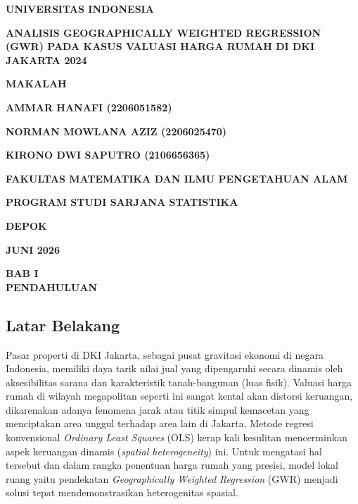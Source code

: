 \documentclass[12pt,a4paper]{article}
\begin{document}
\begin{titlepage}
    \centering
    \vspace*{1cm}
    {\normalsize \textbf{UNIVERSITAS INDONESIA}} \par\vspace{3cm}

    {\large \textbf{ANALISIS GEOGRAPHICALLY WEIGHTED REGRESSION (GWR) PADA KASUS VALUASI HARGA RUMAH DI DKI JAKARTA 2024}} \par\vspace{4cm}

    {\normalsize \textbf{MAKALAH}} \par\vspace{3cm}

    {\normalsize \textbf{AMMAR HANAFI (2206051582)}} \par
    {\normalsize \textbf{NORMAN MOWLANA AZIZ (2206025470)}} \par
    {\normalsize \textbf{KIRONO DWI SAPUTRO (2106656365)}} \par\vfill

    {\normalsize \textbf{FAKULTAS MATEMATIKA DAN ILMU PENGETAHUAN ALAM}} \par
    {\normalsize \textbf{PROGRAM STUDI SARJANA STATISTIKA}} \par
    {\normalsize \textbf{DEPOK}} \par
    {\normalsize \textbf{JUNI 2026}}
\end{titlepage}

\tableofcontents
\newpage
\listoftables
\newpage
\listoffigures
\newpage

\begin{center}
    \bfseries\large
    BAB I \\
    PENDAHULUAN
\end{center}
\setcounter{section}{1}
\setcounter{subsection}{0}

\subsection{Latar Belakang}
Pasar properti di DKI Jakarta, sebagai pusat gravitasi ekonomi di negara Indonesia, memiliki daya tarik nilai jual yang dipengaruhi secara dinamis oleh aksesibilitas sarana dan karakteristik tanah-bangunan (luas fisik). Valuasi harga rumah di wilayah megapolitan seperti ini sangat kental akan distorsi keruangan, dikarenakan adanya fenomena jarak atau titik simpul kemacetan yang menciptakan area unggul terhadap area lain di Jakarta. Metode regresi konvensional \textit{Ordinary Least Squares} (OLS) kerap kali kesulitan mencerminkan aspek keruangan dinamis (\textit{spatial heterogeneity}) ini. Untuk mengatasi hal tersebut dan dalam rangka penentuan harga rumah yang presisi, model lokal ruang yaitu pendekatan \textit{Geographically Weighted Regression} (GWR) menjadi solusi tepat mendemonstrasikan heterogenitas spasial.
\end{document}
